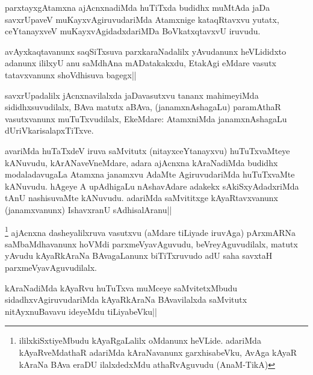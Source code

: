
\begin{artha}
parxtayxgAtamxna ajAcnxnadiMda huTiTxda budidhx muMtAda jaDa savxrUpaveV muKayxvAgiruvudariMda Atamxnige kataqRtavxvu yutatx, ceYtanayxveV muKayxvAgidadxdariMDa BoVkatxqtavxvU iruvudu. 
\end{artha}

\begin{artha}
avAyxkaqtavanunx saqSiTxsuva parxkaraNadalilx yAvudanunx heVLididxto adanunx ililxyU anu saMdhAna mADatakakxdu, EtakAgi eMdare vasutx tatavxvanunx shoVdhisuva bagegx||
\end{artha}


\begin{artha}%
savxrUpadalilx jAcnxnavilalxda jaDavasutxvu tananx mahimeyiMda sididhxsuvudilalx, BAva matutx aBAva, (janamxnAshagaLu) paramAthaR vasutxvanunx muTuTxvudilalx, EkeMdare: AtamxniMda janamxnAshagaLu dUriVkarisalapxTiTxve.
\end{artha}


\begin{artha}
avariMda huTaTxdeV iruva saMvitutx (nitayxceYtanayxvu) huTuTxvaMteye kANuvudu, kArANaveVneMdare, adara ajAcnxna kAraNadiMda budidhx modaladavugaLa Atamxna janamxvu AdaMte AgiruvudariMda huTuTxvaMte kANuvudu. hAgeye A upAdhigaLu nAshavAdare adakekx sAkiSxyAdadxriMda tAnU nashisuvaMte kANuvudu. adariMda saMvititxge kAyaRtavxvanunx (janamxvanunx) IshavxranU sAdhisalAranu||
\end{artha}

\begin{artha}
\footnote[1]{ililxkiSxtiyeMbudu kAyaRgaLalilx oMdanunx heVLide. adariMda kAyaRveMdathaR adariMda kAraNavanunx garxhisabeVku, AvAga kAyaR kAraNa BAva eraDU ilalxdedxMdu athaRvAguvudu (AnaM-TikA)}
ajAcnxna dasheyalilxruva vasutxvu (aMdare tiLiyade iruvAga) pArxmARNa saMbaMdhavanunx hoVMdi parxmeVyavAguvudu, beVreyAguvudilalx, matutx yAvudu kAyaRkAraNa BAvagaLanunx biTiTxruvudo adU saha savxtaH parxmeVyavAguvudilalx.
\end{artha}


\begin{artha}%
kAraNadiMda kAyaRvu huTuTxva muMceye saMvitetxMbudu sidadhxvAgiruvudariMda kAyaRkAraNa BAvavilalxda saMvitutx nitAyxnuBavavu ideyeMdu tiLiyabeVku||
\end{artha}

